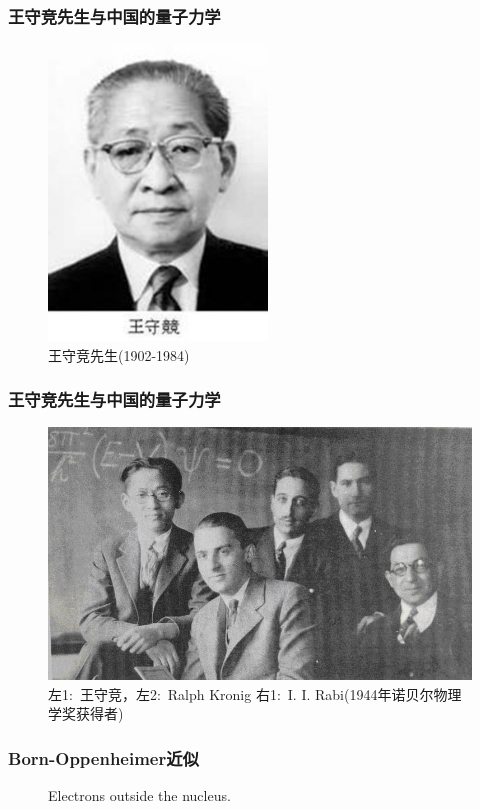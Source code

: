 \documentclass[cjk,slidestop,handout,compress,mathserif,blue]{beamer}	%
\begin{document}
\frame
{
	\frametitle{王守竞先生与中国的量子力学}
\begin{figure}[h!]
\centering
\vspace{-10.5pt}
\includegraphics[height=0.66\textwidth,width=0.52\textwidth,viewport=0 0 270 350,clip]{Figures/Wang_Shoujing.jpg}
\caption{王守竞先生(1902-1984)}
\label{Wang_Shoujing}
\end{figure}
}

\frame
{
	\frametitle{王守竞先生与中国的量子力学}
\begin{figure}[h!]
\centering
\vspace{-10.5pt}
\includegraphics[height=0.60\textwidth,width=1.0\textwidth,viewport=0 0 560 350,clip]{Figures/Collect_Wang.jpg}
\caption{\textrm{左1:~王守竞，左2:~Ralph Kronig 右1:~I. I. Rabi(1944年诺贝尔物理学奖获得者)}}
\label{Collect_Wang}
\end{figure}
}

\frame
{
	\frametitle{Born-Oppenheimer近似}
\begin{figure}[h!]
\centering
	\caption{\textrm{Electrons outside the nucleus.}}
\label{atom-gif}
\end{figure}
}
\end{document}
